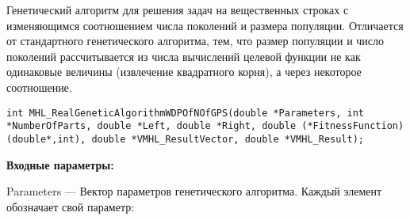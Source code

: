 \documentclass[a4paper,12pt]{article}
\begin{document}
Генетический алгоритм для решения задач на вещественных строках с изменяющимся соотношением числа поколений и размера популяции. Отличается от стандартного генетического алгоритма, тем, что размер популяции и число поколений рассчитывается из числа вычислений целевой функции не как одинаковые величины (извлечение квадратного корня), а через некоторое соотношение.


\begin{lstlisting}[label=code_syntax_MHL_RealGeneticAlgorithmWDPOfNOfGPS,caption=Синтаксис]
int MHL_RealGeneticAlgorithmWDPOfNOfGPS(double *Parameters, int *NumberOfParts, double *Left, double *Right, double (*FitnessFunction)(double*,int), double *VMHL_ResultVector, double *VMHL_Result);
\end{lstlisting}

\textbf{Входные параметры:}
 
Parameters --- Вектор параметров генетического алгоритма. Каждый элемент обозначает свой параметр:
 
\end{document}
